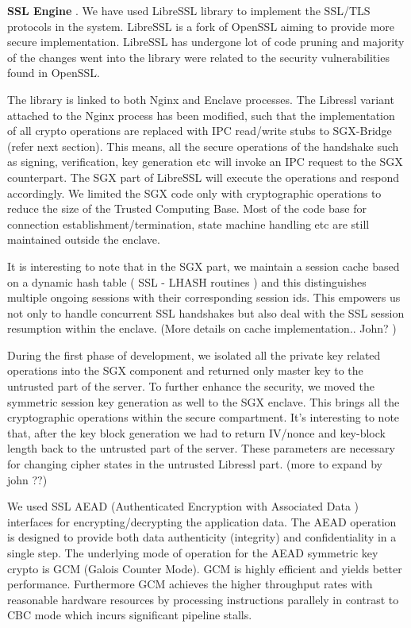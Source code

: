 \documentclass[../main.tex]{subfiles}
\begin{document}
\item \textbf{SSL Engine }.
We have used LibreSSL library to implement the SSL/TLS protocols in the system. LibreSSL is a fork of OpenSSL aiming to provide more secure implementation. LibreSSL has undergone lot of code pruning and majority of the changes went into the library were related to the security vulnerabilities found in OpenSSL. 

The library is linked to both Nginx and Enclave processes. The Libressl variant attached to the Nginx process has been modified, such that  the implementation of all crypto operations are replaced with IPC read/write stubs to SGX-Bridge (refer next section).  This means,  all the secure operations of the handshake such as signing, verification, key generation etc will invoke an IPC request to the SGX counterpart. The SGX part of LibreSSL will  execute the operations and respond accordingly. We limited the SGX  code only with cryptographic operations to reduce the size of the Trusted Computing Base. Most of the code base for connection establishment/termination, state machine handling etc are still maintained outside the enclave. 

It is interesting to note that in the SGX part, we maintain a session cache based on a dynamic hash table ( SSL - LHASH routines ) and this distinguishes multiple ongoing sessions with their corresponding session ids. This empowers us not only to handle concurrent SSL handshakes but also deal with the SSL session resumption within the enclave. 
 (More details on cache implementation.. John? )


During the first phase of development, we isolated all the private key related operations into the SGX component and returned only master key to the untrusted part of the server. To further enhance the security, we moved the symmetric session key generation as well to the SGX enclave.  This brings all the cryptographic operations within the secure compartment. It’s interesting to note that, after the key block generation we had to return IV/nonce and key-block length back to the untrusted part of the server. These parameters are necessary for changing cipher states in the untrusted Libressl part.  (more to expand by john ??)

We used SSL AEAD (Authenticated Encryption with Associated Data ) interfaces for encrypting/decrypting the application data. The AEAD operation is designed to provide both data authenticity (integrity) and confidentiality in a single step. The  underlying mode of operation for the AEAD symmetric key crypto is GCM (Galois Counter Mode). GCM is highly efficient and yields better performance. Furthermore GCM achieves the higher throughput rates with reasonable hardware resources by processing instructions parallely in contrast to CBC mode which incurs significant pipeline stalls.
\end{document}
